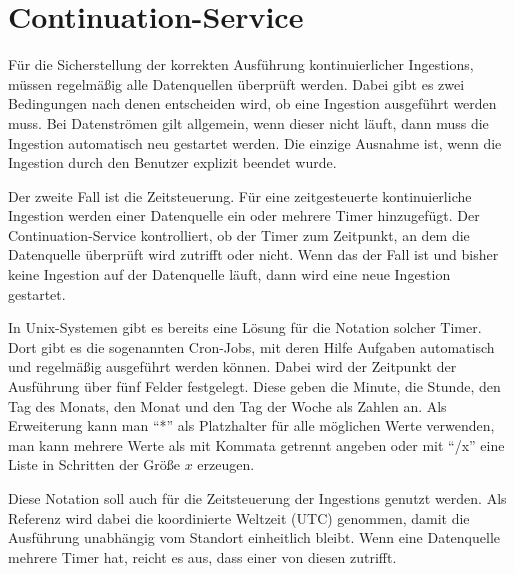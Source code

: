 \section{Continuation-Service}

Für die Sicherstellung der korrekten Ausführung kontinuierlicher Ingestions, müssen regelmäßig alle Datenquellen überprüft werden.
Dabei gibt es zwei Bedingungen nach denen entscheiden wird, ob eine Ingestion ausgeführt werden muss.
Bei Datenströmen gilt allgemein, wenn dieser nicht läuft, dann muss die Ingestion automatisch neu gestartet werden.
Die einzige Ausnahme ist, wenn die Ingestion durch den Benutzer explizit beendet wurde.

Der zweite Fall ist die Zeitsteuerung.
Für eine zeitgesteuerte kontinuierliche Ingestion werden einer Datenquelle ein oder mehrere Timer hinzugefügt.
Der Continuation-Service kontrolliert, ob der Timer zum Zeitpunkt, an dem die Datenquelle überprüft wird zutrifft oder nicht.
Wenn das der Fall ist und bisher keine Ingestion auf der Datenquelle läuft, dann wird eine neue Ingestion gestartet.

In Unix-Systemen gibt es bereits eine Lösung für die Notation solcher Timer.
Dort gibt es die sogenannten Cron-Jobs, mit deren Hilfe Aufgaben automatisch und regelmäßig ausgeführt werden können.
Dabei wird der Zeitpunkt der Ausführung über fünf Felder festgelegt.
Diese geben die Minute, die Stunde, den Tag des Monats, den Monat und den Tag der Woche als Zahlen an.
Als Erweiterung kann man "`*"' als Platzhalter für alle möglichen Werte verwenden, man kann mehrere Werte als mit Kommata getrennt angeben oder mit "`/x"' eine Liste in Schritten der Größe $x$ erzeugen.

Diese Notation soll auch für die Zeitsteuerung der Ingestions genutzt werden.
Als Referenz wird dabei die koordinierte Weltzeit (UTC) genommen, damit die Ausführung unabhängig vom Standort einheitlich bleibt.
Wenn eine Datenquelle mehrere Timer hat, reicht es aus, dass einer von diesen zutrifft.